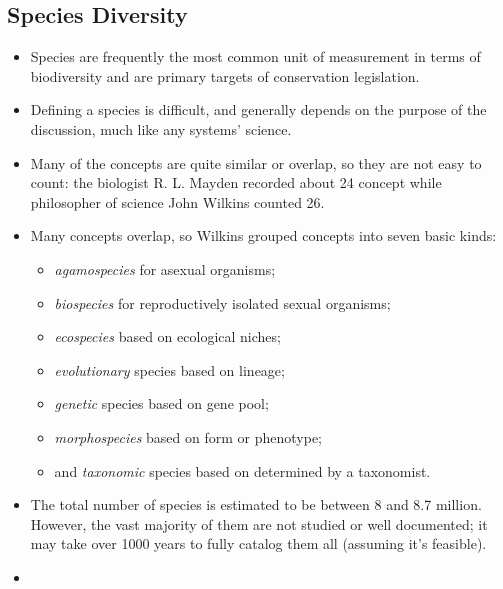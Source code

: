 \documentclass{inVerba-notes}
\begin{document}
\begin{itemize}
    \subsection{Species Diversity}\label{Species Diversity}
    \begin{itemize}
        \item Species are frequently the most common unit of measurement in terms of biodiversity and are primary targets of conservation legislation.
        \item Defining a species is difficult, and generally depends on the purpose of the discussion, much like any systems' science.
        \item Many of the concepts are quite similar or overlap, so they are not easy to count: the biologist R. L. Mayden recorded about 24 concept while philosopher of science John Wilkins counted 26.
        \item Many concepts overlap, so Wilkins grouped concepts into seven basic kinds:
        \begin{itemize}
            \item \emph{agamospecies} for asexual organisms;
            \item \emph{biospecies} for reproductively isolated sexual organisms;
            \item \emph{ecospecies} based on ecological niches;
            \item \emph{evolutionary} species based on lineage;
            \item \emph{genetic} species based on gene pool;
            \item \emph{morphospecies} based on form or phenotype;
            \item and \emph{taxonomic} species based on determined by a taxonomist.
        \end{itemize}
        \item The total number of species is estimated to be between 8 and 8.7 million. However, the vast majority of them are not studied or well documented; it may take over 1000 years to fully catalog them all (assuming it's feasible).
        \item {}
    \end{itemize}
    

\end{itemize}
\end{document}

